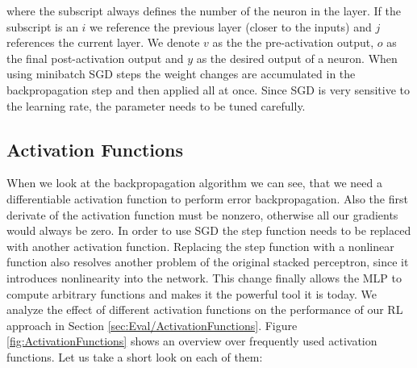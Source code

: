 where the subscript always defines the number of the neuron in the layer. If the subscript is an $i$ we reference the previous layer (closer to the inputs) and $j$ references the current layer. We denote $v$ as the the pre-activation output, $o$ as the final post-activation output and $y$ as the desired output of a neuron.
When using minibatch SGD steps the weight changes are accumulated in the backpropagation step and then applied all at once. Since SGD is very sensitive to the learning rate, the parameter needs to be tuned carefully.

\subsection{Activation Functions} \label{ssec:ActivationFunctions}
When we look at the backpropagation algorithm we can see, that we need a differentiable activation function to perform error backpropagation. Also the first derivate of the activation function must be nonzero, otherwise all our gradients would always be zero. In order to use SGD the step function needs to be replaced with another activation function. Replacing the step function with a nonlinear function also resolves another problem of the original stacked perceptron, since it introduces nonlinearity into the network. This change finally allows the MLP to compute arbitrary functions and makes it the powerful tool it is today. We analyze the effect of different activation functions on the performance of our RL approach in Section \ref{sec:Eval/ActivationFunctions}. Figure \ref{fig:ActivationFunctions} shows an overview over frequently used activation functions. Let us take a short look on each of them:


